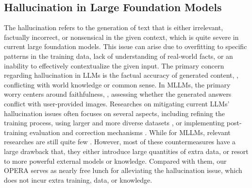 \documentclass[10pt,twocolumn,letterpaper]{article}
\begin{document}
\subsection{Hallucination in Large Foundation Models}

The hallucination \cite{ji2023survey,zhang2023language} refers to the generation of text that is either irrelevant, factually incorrect, or nonsensical in the given context, which is quite severe in current large foundation models. 
This issue can arise due to overfitting to specific patterns in the training data, lack of understanding of real-world facts, or an inability to effectively contextualize the given input.
The primary concern regarding hallucination in LLMs is the factual accuracy of generated content, \ie, conflicting with world knowledge or common sense. 
In MLLMs, the primary worry centers around faithfulness, \ie, assessing whether the generated answers conflict with user-provided images.
Researches on mitigating current LLMs' hallucination issues often focuses on several aspects, including refining the training process, using larger and more diverse datasets \cite{lee2022factuality}, or implementing post-training evaluation \cite{du2023improving} and correction mechanisms \cite{peng2023check,manakul2023selfcheckgpt}. 
While for MLLMs, relevant researches are still quite few \cite{liu2023aligning,zhou2023analyzing,yin2023woodpecker}. 
However, most of these countermeasures have a large drawback that, they either introduce large quantities of extra data, or resort to more powerful external models or knowledge. 
Compared with them, our OPERA serves as nearly free lunch for alleviating the hallucination issue, which does not incur extra training, data, or knowledge. 
\end{document}
